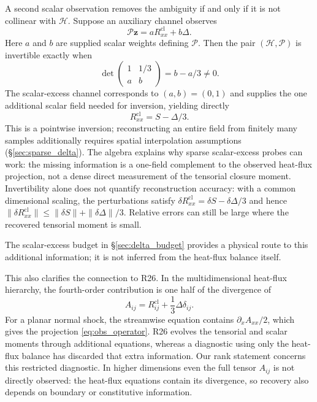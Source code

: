 \documentclass[lineno,paper]{JFM-FLM_Au}
\newenvironment{revision}{\nolinenumbers\begin{tcolorbox}[breakable,colback=revisionyellow,colframe=revisionyellow,boxrule=0pt,arc=0pt,left=5pt,right=5pt,top=5pt,bottom=5pt,before skip=6pt,after skip=6pt]\captionsetup{width=\linewidth}}{\end{tcolorbox}\linenumbers}
\newenvironment{revision}{}{}
\newcommand{\cl}{\mathrm{cl}}
\begin{document}
\begin{revision}
A second scalar observation removes the ambiguity if and only if it is not collinear with $\mathcal H$.  Suppose an auxiliary channel observes
\begin{equation}
  \mathcal P\boldsymbol z = aR^{\cl}_{xx}+b\Delta .
  \label{eq:aux_channel}
\end{equation}
Here $a$ and $b$ are supplied scalar weights defining $\mathcal P$. Then the pair $(\mathcal H,\mathcal P)$ is invertible exactly when
\begin{equation}
  \det\begin{pmatrix}1 & 1/3\\ a & b\end{pmatrix}= b-a/3 \neq 0 .
  \label{eq:invert_condition}
\end{equation}
The scalar-excess channel corresponds to $(a,b)=(0,1)$ and supplies the one additional scalar field needed for inversion, yielding directly
\begin{equation}
  R^{\cl}_{xx}=S-\Delta/3 .
  \label{eq:R_from_S_Delta}
\end{equation}
This is a pointwise inversion; reconstructing an entire field from finitely many samples additionally requires spatial interpolation assumptions (\S\ref{sec:sparse_delta}). The algebra explains why sparse scalar-excess probes can work: the missing information is a one-field complement to the observed heat-flux projection, not a dense direct measurement of the tensorial closure moment. Invertibility alone does not quantify reconstruction accuracy: with a common dimensional scaling, the perturbations satisfy $\delta R^{\cl}_{xx}=\delta S-\delta\Delta/3$ and hence $\|\delta R^{\cl}_{xx}\|\leq\|\delta S\|+\|\delta\Delta\|/3$. Relative errors can still be large where the recovered tensorial moment is small.

The scalar-excess budget in \S\ref{sec:delta_budget} provides a physical route to this additional information; it is not inferred from the heat-flux balance itself.
\end{revision}

\begin{revision}
This also clarifies the connection to R26. In the multidimensional heat-flux hierarchy, the fourth-order contribution is one half of the divergence of
\begin{equation}
  A_{ij}=R^{\cl}_{ij}+\frac{1}{3}\Delta\delta_{ij} .
  \label{eq:Aij}
\end{equation}
For a planar normal shock, the streamwise equation contains $\partial_x A_{xx}/2$, which gives the projection \eqref{eq:obs_operator}. R26 evolves the tensorial and scalar moments through additional equations, whereas a diagnostic using only the heat-flux balance has discarded that extra information. Our rank statement concerns this restricted diagnostic. In higher dimensions even the full tensor $A_{ij}$ is not directly observed: the heat-flux equations contain its divergence, so recovery also depends on boundary or constitutive information.
\end{revision}
\end{document}
